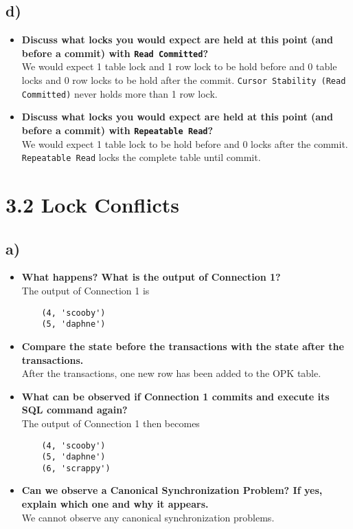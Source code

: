\documentclass[a4paper,english,abstract=on]{scrartcl}
\begin{document}
\subsection*{d)}
\begin{itemize}
\item \textbf{Discuss what locks you would expect are held at this point (and before a commit) with \texttt{Read Committed}?}\\
We would expect 1 table lock and 1 row lock to be hold before and 0 table locks and 0 row locks to be hold after the commit. \texttt{Cursor Stability (Read Committed)} never holds more than 1 row lock.

\item \textbf{Discuss what locks you would expect are held at this point (and before a commit) with \texttt{Repeatable Read}?}\\
We would expect 1 table lock to be hold before and 0 locks after the commit. \texttt{Repeatable Read} locks the complete table until commit.
\end{itemize}

\section*{3.2 Lock Conflicts}
\subsection*{a)}
\begin{itemize}
	\item \textbf{What happens? What is the output of Connection 1?}\\
	The output of Connection 1 is
	\begin{lstlisting}
	(4, 'scooby')
	(5, 'daphne')
	\end{lstlisting}
	\item \textbf{Compare the state before the transactions with the state after the transactions.}\\
	After the transactions, one new row has been added to the OPK table.
	\item \textbf{What can be observed if Connection 1 commits and execute its SQL command again?}\\
	The output of Connection 1 then becomes
	\begin{lstlisting}
	(4, 'scooby')
	(5, 'daphne')
	(6, 'scrappy')
	\end{lstlisting}
	\item \textbf{Can we observe a Canonical Synchronization Problem? If yes, explain which one and why it appears.}\\
	We cannot observe any canonical synchronization problems.
\end{itemize}
\end{document}
